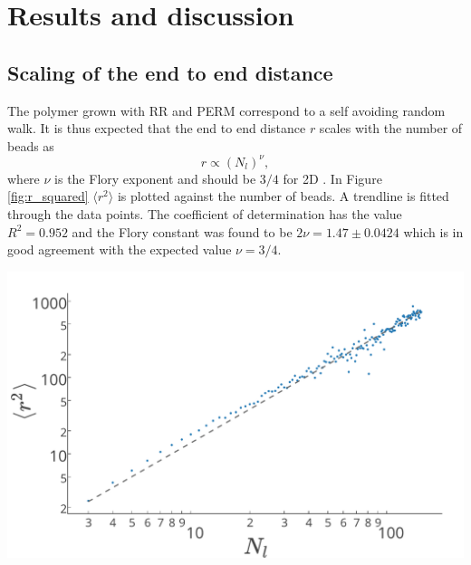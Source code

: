 \section{Results and discussion}

\subsection{Scaling of the end to end distance}
The polymer grown with RR and PERM correspond to a self avoiding random walk. It is thus expected that the end to end distance $r$ scales with the number of beads as 
\begin{equation*}
    r \propto \left(N_l\right)^\nu,
\end{equation*} where $\nu$ is the Flory exponent and should be $3/4$ for 2D \cite{jmt}. In Figure \ref{fig:r_squared} $\langle r^2\rangle$ is plotted against the number of beads. A trendline is fitted through the data points. The coefficient of determination has the value $R^2 = 0.952$ and the Flory constant was found to be $2\nu = 1.47 \pm 0.0424$ which is in good agreement with the expected value $\nu=3/4$.  
\begin{Figure}
    \centering
    \includegraphics[width=\linewidth]{r_squared.pdf}
    \label{fig:r_squared}
\end{Figure}


